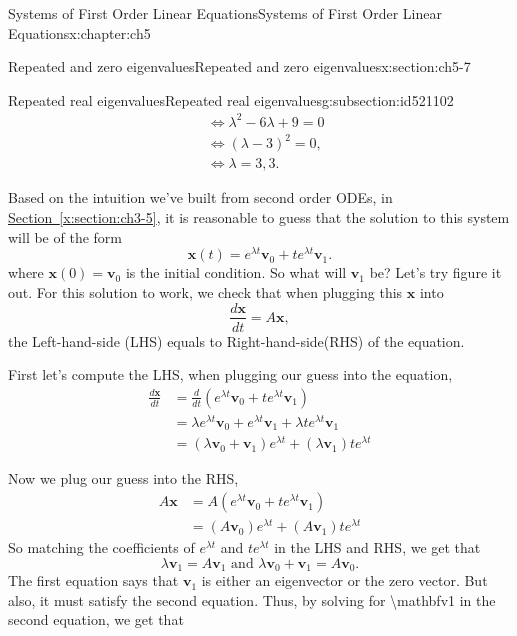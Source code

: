 \documentclass[oneside,10pt,]{book}
\newcommand{\xreffont}{\relax}
\numberwithin{equation}{section}
\numberwithin{equation}{section}
\newcommand{\amp}{&}
\begin{document}
\begin{chapterptx}{Systems of First Order Linear Equations}{}{Systems of First Order Linear Equations}{}{}{x:chapter:ch5}
\begin{sectionptx}{Repeated and zero eigenvalues}{}{Repeated and zero eigenvalues}{}{}{x:section:ch5-7}
\begin{subsectionptx}{Repeated real eigenvalues}{}{Repeated real eigenvalues}{}{}{g:subsection:id521102}
\begin{align*}
\amp \iff  \lambda^{2}-6\lambda+9=0\\
\amp \iff  \left(\lambda-3\right)^{2}=0,\\
\amp \iff \lambda=3,3.
\end{align*}
%
\par
Based on the intuition we've built from second order ODEs, in \hyperref[x:section:ch3-5]{Section~{\xreffont\ref{x:section:ch3-5}}}, it is reasonable to guess that the solution to this system will be of the form%
\begin{equation*}
\mathbf{x}(t)=e^{\lambda t}\mathbf{v}_{0}+te^{\lambda t}\mathbf{v}_{1}.
\end{equation*}
where \(\mathbf{x}(0)=\mathbf{v}_{0}\) is the initial condition. So what will \(\mathbf{v}_{1}\) be? Let's try figure it out. For this solution to work, we check that when plugging this \(\mathbf{x}\) into%
\begin{equation*}
\frac{d\mathbf{x}}{dt}=A\mathbf{x},
\end{equation*}
the Left-hand-side (LHS) equals to Right-hand-side(RHS) of the equation.%
\par
First let's compute the LHS, when plugging our guess into the equation,%
\begin{align*}
\frac{d\mathbf{x}}{dt} \amp =  \frac{d}{dt}\left(e^{\lambda t}\mathbf{v}_{0}+te^{\lambda t}\mathbf{v}_{1}\right)\\
\amp =  \lambda e^{\lambda t}\mathbf{v}_{0}+e^{\lambda t}\mathbf{v}_{1}+\lambda te^{\lambda t}\mathbf{v}_{1}\\
\amp =  \left(\lambda\mathbf{v}_{0}+\mathbf{v}_{1}\right)e^{\lambda t}+\left(\lambda\mathbf{v}_{1}\right)te^{\lambda t}
\end{align*}
%
\par
Now we plug our guess into the RHS,%
\begin{align*}
A\mathbf{x} \amp =  A\left(e^{\lambda t}\mathbf{v}_{0}+te^{\lambda t}\mathbf{v}_{1}\right)\\
\amp =  \left(A\mathbf{v}_{0}\right)e^{\lambda t}+\left(A\mathbf{v}_{1}\right)te^{\lambda t}
\end{align*}
So matching the coefficients of \(e^{\lambda t}\) and \(te^{\lambda t}\) in the LHS and RHS, we get that%
\begin{equation*}
\lambda\mathbf{v}_{1}=A\mathbf{v}_{1}\mbox{ and }\lambda\mathbf{v}_{0}+\mathbf{v}_{1}=A\mathbf{v}_{0}.
\end{equation*}
The first equation says that \(\mathbf{v}_{1}\) is either an eigenvector or the zero vector. But also, it must satisfy the second equation. Thus, by solving for \textdollar{}\textbackslash{}mathbf\textbraceleft{}v\textbraceright{}\textunderscore{}\textbraceleft{}1\textbraceright{}\textdollar{} in the second equation, we get that%

\end{subsectionptx}
\end{sectionptx}
\end{chapterptx}
\end{document}
